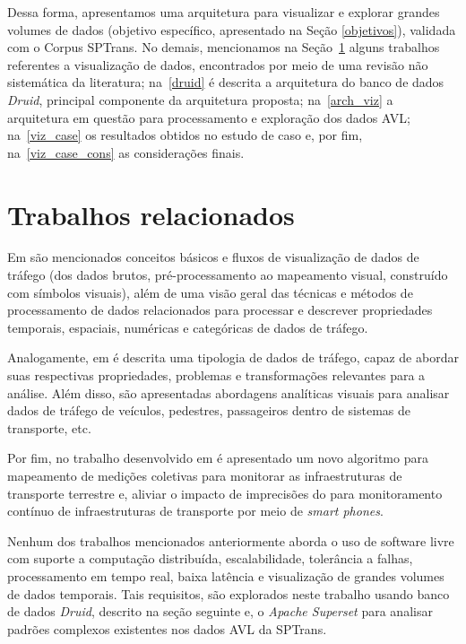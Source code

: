 \documentclass[
	12pt,				%
	oneside,			%
	a4paper,			%
	english,			%
	brazil				%
	]{abntex2ppgsi}
\begin{document}
{{Dessa forma, apresentamos uma arquitetura para visualizar e explorar grandes volumes de dados (objetivo específico, apresentado na Seção \ref{objetivos}), validada com o Corpus SPTrans.  No demais, mencionamos na Seção~\ref{related_work_data_viz} alguns trabalhos referentes a visualização de dados, encontrados por meio de uma revisão não sistemática da literatura; na~\ref{druid} é descrita a arquitetura do banco de dados \textit{Druid}, principal componente da arquitetura proposta; na~\ref{arch_viz} a arquitetura em questão para processamento e exploração dos dados AVL; na~\ref{viz_case} os resultados obtidos no estudo de caso e, por fim, na~\ref{viz_case_cons} as considerações finais.

\section{Trabalhos relacionados}
\label{related_work_data_viz}

Em \cite{chen2015survey} são mencionados conceitos básicos e fluxos de visualização de dados de tráfego (dos dados brutos, pré-processamento ao mapeamento visual, construído com símbolos visuais), além de uma visão geral das técnicas e métodos de processamento de dados relacionados para processar e descrever propriedades temporais, espaciais, numéricas e categóricas de dados de tráfego.

Analogamente, em \cite{andrienko2017visual} é descrita uma tipologia de dados de tráfego, capaz de abordar suas respectivas propriedades, problemas e transformações relevantes para a análise. Além disso, são apresentadas abordagens analíticas visuais para analisar dados de tráfego de veículos, pedestres, passageiros dentro de sistemas de transporte, etc.

Por fim, no trabalho desenvolvido em \cite{seraj2017aggregation} é apresentado um novo algoritmo para mapeamento de medições coletivas para monitorar as infraestruturas de transporte terrestre e, aliviar o impacto de imprecisões do  para monitoramento contínuo de infraestruturas de transporte por meio de \textit{smart phones}.

Nenhum dos trabalhos mencionados anteriormente aborda o uso de software livre com suporte a computação distribuída, escalabilidade, tolerância a falhas, processamento em tempo real, baixa latência e visualização de grandes volumes de dados temporais. Tais requisitos, são explorados neste trabalho usando banco de dados \textit{Druid}, descrito na seção seguinte e, o \textit{Apache Superset} para analisar padrões complexos existentes nos dados AVL da SPTrans.

}}
\end{document}
